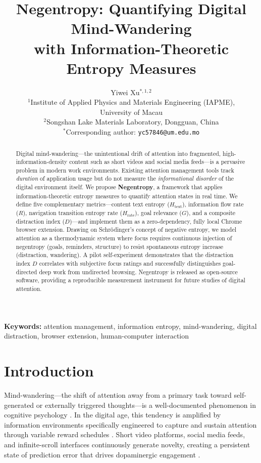 \documentclass[10pt,letterpaper]{article}
\title{\textbf{Negentropy: Quantifying Digital Mind-Wandering\\with Information-Theoretic Entropy Measures}}
\author{
    Yiwei Xu$^{*,1,2}$\\[6pt]
    \small $^1$Institute of Applied Physics and Materials Engineering (IAPME),\\University of Macau\\
    \small $^2$Songshan Lake Materials Laboratory, Dongguan, China\\[4pt]
    \small $^*$Corresponding author: \texttt{yc57846@um.edu.mo}
}
\date{}
\begin{document}
\maketitle

\begin{abstract}
Digital mind-wandering---the unintentional drift of attention into fragmented, high-information-density content such as short videos and social media feeds---is a pervasive problem in modern work environments. Existing attention management tools track \emph{duration} of application usage but do not measure the \emph{informational disorder} of the digital environment itself. We propose \textbf{Negentropy}, a framework that applies information-theoretic entropy measures to quantify attention states in real time. We define five complementary metrics---content text entropy ($H_{\text{text}}$), information flow rate ($R$), navigation transition entropy rate ($H_{\text{rate}}$), goal relevance ($G$), and a composite distraction index ($D$)---and implement them as a zero-dependency, fully local Chrome browser extension. Drawing on Schr\"odinger's concept of negative entropy, we model attention as a thermodynamic system where focus requires continuous injection of negentropy (goals, reminders, structure) to resist spontaneous entropy increase (distraction, wandering). A pilot self-experiment demonstrates that the distraction index $D$ correlates with subjective focus ratings and successfully distinguishes goal-directed deep work from undirected browsing. Negentropy is released as open-source software, providing a reproducible measurement instrument for future studies of digital attention.
\end{abstract}

\noindent\textbf{Keywords:} attention management, information entropy, mind-wandering, digital distraction, browser extension, human-computer interaction

\vspace{12pt}

\section{Introduction}

Mind-wandering---the shift of attention away from a primary task toward self-generated or externally triggered thoughts---is a well-documented phenomenon in cognitive psychology \cite{smallwood2006restless}. In the digital age, this tendency is amplified by information environments specifically engineered to capture and sustain attention through variable reward schedules \cite{alter2017irresistible}. Short video platforms, social media feeds, and infinite-scroll interfaces continuously generate novelty, creating a persistent state of prediction error that drives dopaminergic engagement \cite{schultz2016dopamine}.
\end{document}
